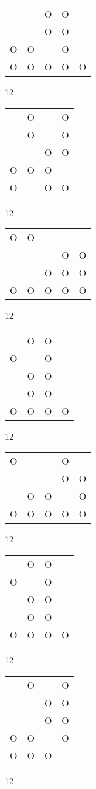 \begin{tabular}{|m{0.2cm}m{0.2cm}m{0.2cm}m{0.2cm}m{0.2cm}|}\hline
 & &O&O& \\
 & &O&O& \\
O&O& &O& \\
O&O&O&O&O\\
\hline\end{tabular}12
\begin{tabular}{|m{0.2cm}m{0.2cm}m{0.2cm}m{0.2cm}|}\hline
 &O& &O\\
 &O& &O\\
 & &O&O\\
O&O&O& \\
O& &O&O\\
\hline\end{tabular}12
\begin{tabular}{|m{0.2cm}m{0.2cm}m{0.2cm}m{0.2cm}m{0.2cm}|}\hline
O&O& & & \\
 & & &O&O\\
 & &O&O&O\\
O&O&O&O&O\\
\hline\end{tabular}12
\begin{tabular}{|m{0.2cm}m{0.2cm}m{0.2cm}m{0.2cm}|}\hline
 &O&O& \\
O& &O& \\
 &O&O& \\
 &O&O& \\
O&O&O&O\\
\hline\end{tabular}12
\begin{tabular}{|m{0.2cm}m{0.2cm}m{0.2cm}m{0.2cm}m{0.2cm}|}\hline
O& & &O& \\
 & & &O&O\\
 &O&O& &O\\
O&O&O&O&O\\
\hline\end{tabular}12
\begin{tabular}{|m{0.2cm}m{0.2cm}m{0.2cm}m{0.2cm}|}\hline
 &O&O& \\
O& &O& \\
 &O&O& \\
 &O&O& \\
O&O&O&O\\
\hline\end{tabular}12
\begin{tabular}{|m{0.2cm}m{0.2cm}m{0.2cm}m{0.2cm}|}\hline
 &O& &O\\
 & &O&O\\
 & &O&O\\
O&O& &O\\
O&O&O& \\
\hline\end{tabular}12
